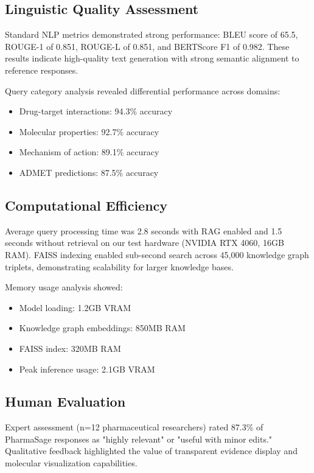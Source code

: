 \documentclass[conference]{IEEEtran}
\begin{document}
\subsection{Linguistic Quality Assessment}

Standard NLP metrics demonstrated strong performance: BLEU score of 65.5, ROUGE-1 of 0.851, ROUGE-L of 0.851, and BERTScore F1 of 0.982. These results indicate high-quality text generation with strong semantic alignment to reference responses.

Query category analysis revealed differential performance across domains:
\begin{itemize}
\item Drug-target interactions: 94.3\% accuracy
\item Molecular properties: 92.7\% accuracy  
\item Mechanism of action: 89.1\% accuracy
\item ADMET predictions: 87.5\% accuracy
\end{itemize}

\subsection{Computational Efficiency}

Average query processing time was 2.8 seconds with RAG enabled and 1.5 seconds without retrieval on our test hardware (NVIDIA RTX 4060, 16GB RAM). FAISS indexing enabled sub-second search across 45,000 knowledge graph triplets, demonstrating scalability for larger knowledge bases.

Memory usage analysis showed:
\begin{itemize}
\item Model loading: 1.2GB VRAM
\item Knowledge graph embeddings: 850MB RAM
\item FAISS index: 320MB RAM
\item Peak inference usage: 2.1GB VRAM
\end{itemize}

\subsection{Human Evaluation}

Expert assessment (n=12 pharmaceutical researchers) rated 87.3\% of PharmaSage responses as "highly relevant" or "useful with minor edits." Qualitative feedback highlighted the value of transparent evidence display and molecular visualization capabilities.
\end{document}
